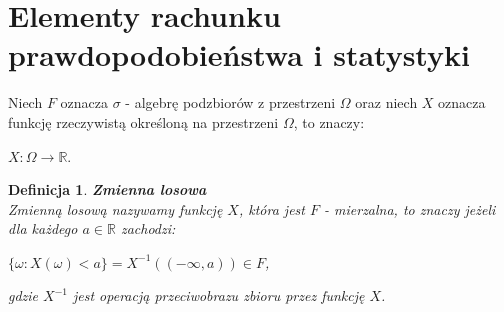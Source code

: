 \documentclass[12pt,a4paper]{report}
\newtheorem{df}{Definicja}
\begin{document}
\section{Elementy rachunku prawdopodobieństwa i statystyki}
Niech $F$ oznacza $\sigma$ - algebrę podzbiorów z przestrzeni $\Omega$ oraz niech $X$ oznacza funkcję rzeczywistą określoną na przestrzeni $\Omega$, to znaczy: %
\begin{center}
$X: \Omega \longrightarrow \mathbb{R}$.
\end{center}
\begin{df}\textbf{Zmienna losowa}%
\\Zmienną losową nazywamy funkcję $X$, która jest $F$ - mierzalna, to znaczy jeżeli dla każdego $a\in\mathbb{R}$ zachodzi:
\begin{center}
$\{\omega : X(\omega) < a\} = X^{-1}((-\infty,a))\in F$, 
\end{center}
gdzie $X^{-1}$ jest operacją przeciwobrazu zbioru przez funkcję $X$.
\end{df}
\end{document}
